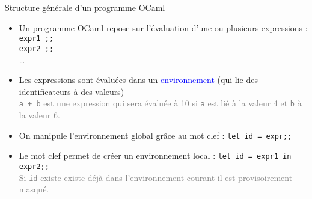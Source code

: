 \documentclass[10pt]{beamer}
\begin{document}
\begin{frame}{\Ctitle}{\stitle}
	\begin{block}{Structure générale d'un programme OCaml}
		\begin{itemize}
			\item <1-> Un programme OCaml repose sur l'évaluation d'une ou plusieurs expressions : \\
			      {\tt expr1 ;;} \\
			      {\tt expr2 ;;}\\
			      \dots\\
			\item <2-> Les expressions sont évaluées dans un \textcolor{blue}{environnement} (qui lie des identificateurs à des valeurs) \\
			      \textcolor{gray}{ {\tt a + b} est une expression qui sera évaluée à 10 si {\tt a} est lié à la valeur 4 et {\tt b} à la valeur 6.}
			\item  <3-> On manipule l'environnement \textcolor{BrickRed}{global} grâce au mot clef  : \texttt{let id = expr;;}
			\item <4-> Le mot clef  permet de créer un environnement \textcolor{BrickRed}{local} : \texttt{let id = expr1 in expr2;;} \\
			      \textcolor{gray}{Si {\tt id} existe existe déjà dans l'environnement courant il est provisoirement masqué.}
		\end{itemize}
	\end{block}
\end{frame}
\end{document}
